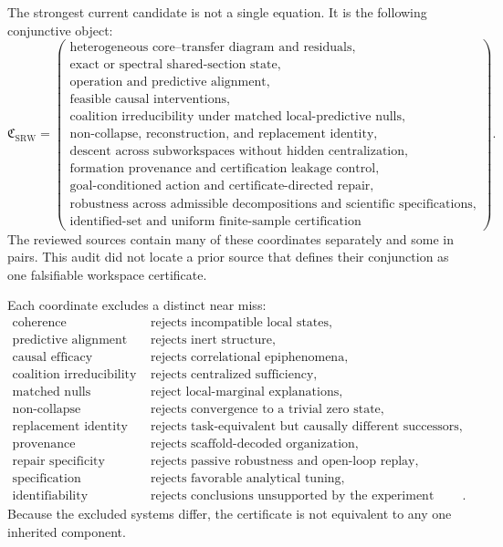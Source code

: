 The strongest current candidate is not a single equation. It is the following
conjunctive object:
\[
\boxed{
\mathfrak C_{\mathrm{SRW}}
=
\left(
\begin{array}{c}
\text{heterogeneous core--transfer diagram and residuals},\\
\text{exact or spectral shared-section state},\\
\text{operation and predictive alignment},\\
\text{feasible causal interventions},\\
\text{coalition irreducibility under matched local-predictive nulls},\\
\text{non-collapse, reconstruction, and replacement identity},\\
\text{descent across subworkspaces without hidden centralization},\\
\text{formation provenance and certification leakage control},\\
\text{goal-conditioned action and certificate-directed repair},\\
\text{robustness across admissible decompositions and scientific specifications},\\
\text{identified-set and uniform finite-sample certification}
\end{array}
\right).
}
\]
The reviewed sources contain many of these coordinates separately and some in
pairs. This audit did not locate a prior source that defines their conjunction
as one falsifiable workspace certificate.


Each coordinate excludes a distinct near miss:
\[
\begin{array}{ll}
\text{coherence} & \text{rejects incompatible local states},\\
\text{predictive alignment} & \text{rejects inert structure},\\
\text{causal efficacy} & \text{rejects correlational epiphenomena},\\
\text{coalition irreducibility} & \text{rejects centralized sufficiency},\\
\text{matched nulls} & \text{reject local-marginal explanations},\\
\text{non-collapse} & \text{rejects convergence to a trivial zero state},\\
\text{replacement identity} & \text{rejects task-equivalent but causally different successors},\\
\text{provenance} & \text{rejects scaffold-decoded organization},\\
\text{repair specificity} & \text{rejects passive robustness and open-loop replay},\\
\text{specification robustness} & \text{rejects favorable analytical tuning},\\
\text{identifiability} & \text{rejects conclusions unsupported by the experiment family}.
\end{array}
\]
Because the excluded systems differ, the certificate is not equivalent to any
one inherited component.

